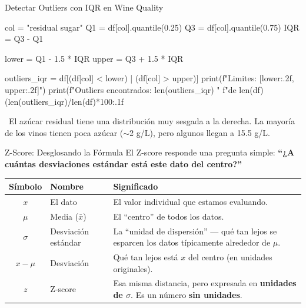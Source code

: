\documentclass[aspectratio=169, 11pt]{beamer}
\begin{document}
\begin{frame}[fragile,shrink=28]{Detectar Outliers con IQR en Wine Quality}
  \vspace{-6pt}
  \begin{pyblock}
col = "residual sugar"
Q1 = df[col].quantile(0.25)
Q3 = df[col].quantile(0.75)
IQR = Q3 - Q1

lower = Q1 - 1.5 * IQR
upper = Q3 + 1.5 * IQR

outliers_iqr = df[(df[col] < lower) | (df[col] > upper)]
print(f"Limites: [{lower:.2f}, {upper:.2f}]")
print(f"Outliers encontrados: {len(outliers_iqr)} "
      f"de {len(df)} ({len(outliers_iqr)/len(df)*100:.1f}%
  \end{pyblock}

  \vspace{4pt}
  {\scriptsize\color{textMuted}
    \faLightbulb\ El azúcar residual tiene una distribución muy sesgada a la derecha.
    La mayoría de los vinos tienen poca azúcar ($\sim$2 g/L),
    pero algunos llegan a 15.5 g/L.}
\end{frame}

\begin{frame}[shrink=10]{Z-Score: Desglosando la Fórmula}
  \vspace{-4pt}
  {\footnotesize
    El Z-score responde una pregunta simple:
    \textbf{``¿A cuántas desviaciones estándar está este dato del centro?''}}

  \vspace{6pt}
  \begin{center}
  \end{center}

  \vspace{4pt}
  {\small
  \renewcommand{\arraystretch}{1.4}
  \begin{tabular}{@{}clp{7.5cm}@{}}
    \toprule
    \textbf{Símbolo} & \textbf{Nombre} & \textbf{Significado} \\
    \midrule
    $x$ & El dato & El valor individual que estamos evaluando. \\
    $\mu$ & Media ($\bar{x}$) & El ``centro'' de todos los datos. \\
    $\sigma$ & Desviación estándar & La ``unidad de dispersión'' --- qué tan lejos se esparcen los datos
      típicamente alrededor de $\mu$. \\
    $x - \mu$ & Desviación & Qué tan lejos está $x$ del centro (en unidades originales). \\
    $z$ & Z-score & Esa misma distancia, pero expresada en \textbf{unidades de $\sigma$}.
      Es un número \textbf{sin unidades}. \\
    \bottomrule
  \end{tabular}
  }
\end{frame}
\end{document}
